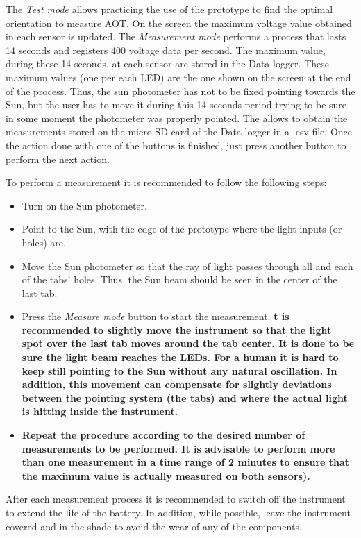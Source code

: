 \documentclass[12pt,letterpaper]{article}
\numberwithin{figure}{section}
\numberwithin{equation}{section}
\numberwithin{table}{section}
\begin{document}
The \textit{Test mode} allows practicing the use of the prototype to find the optimal orientation to measure AOT. On the screen the maximum voltage value obtained in each sensor is updated. The \textit{Measurement mode} performs a process that lasts 14 seconds and registers 400 voltage data per second. The maximum value, during these 14 seconds, at each sensor are stored in the Data logger. These maximum values (one per each LED) are the one shown on the screen at the end of the process. Thus, the sun photometer has not to be fixed pointing towards the Sun, but the user has to move it during this 14 seconds period trying to be sure in some moment the photometer was properly pointed. The  allows to obtain the measurements stored on the micro SD card of the Data logger in a .csv file. Once the action done with one of the buttons is finished, just press another button to perform the next action.

To perform a measurement it is recommended to follow the following steps:

\begin{itemize}
	\item Turn on the Sun photometer.
	\item Point to the Sun, with the edge of the prototype where the light inputs (or holes) are.
	\item Move the Sun photometer so that the ray of light passes through all and each of the tabs' holes. Thus, the Sun beam should be seen in the center of the last tab.
	\item Press the \textit{Measure mode} button to start the measurement. \textbf{t is recommended to slightly move the instrument so that the light spot over the last tab moves around the tab center. It is done to be sure the light beam reaches the LEDs. For a human it is hard to keep still pointing to the Sun without any natural oscillation. In addition, this movement can compensate for slightly deviations between the pointing system (the tabs) and where the actual light is hitting inside the instrument.}
	\item \textbf{Repeat the procedure according to the desired number of measurements to be performed. It is advisable to perform more than one measurement in a time range of 2 minutes to ensure that the maximum value is actually measured on both sensors).}
\end{itemize}

After each measurement process it is recommended to switch off the instrument to extend the life of the battery. In addition, while possible, leave the instrument covered and in the shade to avoid the wear of any of the components.
\end{document}

